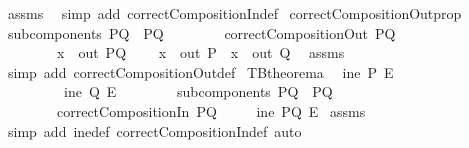 \begin{isabellebody}
%
\isadelimproof
%
\endisadelimproof
%
\isatagproof
{}\isamarkupfalse%
\ assms\ \isamarkupfalse%
\ {\isacharparenleft}simp\ add{\isacharcolon}\ correctCompositionIn{\isacharunderscore}def{\isacharparenright}%
\endisatagproof
{\isafoldproof}%
%
\isadelimproof
\isanewline
%
\endisadelimproof
\isanewline
{}\isamarkupfalse%
\ correctCompositionOut{\isacharunderscore}prop{}{\isacharcolon}\isanewline
{}\ {\isachardoublequoteopen}subcomponents\ PQ\ {\isacharequal}\ {\isacharbraceleft}P{\isacharcomma}Q{\isacharbraceright}{\isachardoublequoteclose}\isanewline
\ \ \ \ \ \ \ \ {\isachardoublequoteopen}correctCompositionOut\ PQ{\isachardoublequoteclose}\isanewline
\ \ \ \ \ \ \ \ {\isachardoublequoteopen}x\ {\isasymin}\ {\isacharparenleft}out\ PQ{\isacharparenright}{\isachardoublequoteclose}\isanewline
{}\ \ \ \ {\isachardoublequoteopen}{\isacharparenleft}x\ {\isasymin}\ {\isacharparenleft}out\ P{\isacharparenright}{\isacharparenright}\ {\isasymor}\ {\isacharparenleft}x\ {\isasymin}\ {\isacharparenleft}out\ Q{\isacharparenright}{\isacharparenright}{\isachardoublequoteclose}\ \isanewline
%
\isadelimproof
%
\endisadelimproof
%
\isatagproof
{}\isamarkupfalse%
\ assms\ \isamarkupfalse%
\ {\isacharparenleft}simp\ add{\isacharcolon}\ correctCompositionOut{\isacharunderscore}def{\isacharparenright}%
\endisatagproof
{\isafoldproof}%
%
\isadelimproof
\isanewline
%
\endisadelimproof
\isanewline
{}\isamarkupfalse%
\ TBtheorem{}a{\isacharcolon}\isanewline
{}\ {\isachardoublequoteopen}{\isasymnot}\ {\isacharparenleft}ine\ P\ E{\isacharparenright}{\isachardoublequoteclose}\isanewline
\ \ \ \ \ \ \ \ {\isachardoublequoteopen}{\isasymnot}\ {\isacharparenleft}ine\ Q\ E{\isacharparenright}{\isachardoublequoteclose}\isanewline
\ \ \ \ \ \ \ \ {\isachardoublequoteopen}subcomponents\ PQ\ {\isacharequal}\ {\isacharbraceleft}P{\isacharcomma}Q{\isacharbraceright}{\isachardoublequoteclose}\isanewline
\ \ \ \ \ \ \ \ {\isachardoublequoteopen}correctCompositionIn\ PQ{\isachardoublequoteclose}\isanewline
{}\ \ \ \ {\isachardoublequoteopen}{\isasymnot}\ {\isacharparenleft}ine\ PQ\ E{\isacharparenright}{\isachardoublequoteclose}\isanewline
%
\isadelimproof
%
\endisadelimproof
%
\isatagproof
{}\isamarkupfalse%
\ assms\ \isamarkupfalse%
\ {\isacharparenleft}simp\ add{\isacharcolon}\ ine{\isacharunderscore}def\ correctCompositionIn{\isacharunderscore}def{\isacharcomma}\ auto\ {\isacharparenright}%

\end{isabellebody}
